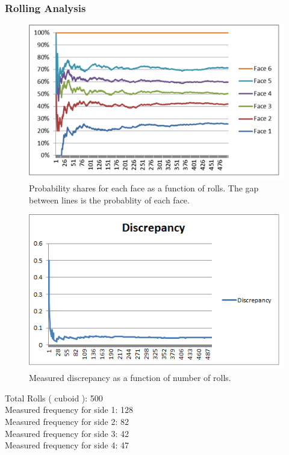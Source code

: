 \subsubsection{Rolling Analysis}
\begin{figure}[h]
\center
\includegraphics[scale=1]{cuboid_graph.png}
\caption{Probability shares for each face as a function of rolls. The gap between lines is the probablity of each face.}
\label{fig:cuboid}
\end{figure}
\begin{figure}[h]
\center
\includegraphics[scale=1]{cuboid_di.png}
\caption{Measured discrepancy as a function of number of rolls.}
\label{fig:cuboid}
\end{figure}
Total Rolls ( cuboid ): 500\\
Measured frequency for side 1: 128\\
Measured frequency for side 2: 82\\
Measured frequency for side 3: 42\\
Measured frequency for side 4: 47\\
